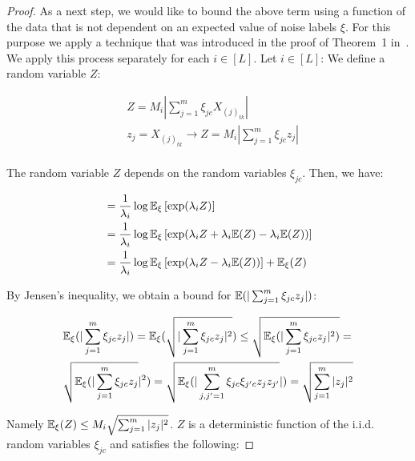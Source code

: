 \begin{proof}
As a next step, we would like to bound the above term using a function of the data that is not dependent on an expected value of noise labels $\xi$. For this purpose we apply a technique that was introduced in the proof of Theorem~1 in~\citep{golowich2018size}. We apply this process separately for each $i \in [L]$. Let $i \in [L]$:
We define a random variable $Z$:
\begin{small}
\begin{equation*}
\begin{aligned}
&Z = M_i  \left| \sum_{j=1}^m \xi_{jc} X^{}_{{(j)}_{tk}} \right| \\
&z_j = X^{}_{{(j)}_{tk}} \rightarrow Z = M_i |\sum_{j=1}^m \xi_{jc} z_j | \\
\end{aligned}
\end{equation*}
\end{small}
The random variable $Z$ depends on the random variables $\xi_{jc}$.
Then, we have: 
\begin{small}
\begin{equation*}
\begin{aligned}
&=\frac{1}{\lambda_i} \log \mathbb{E}_{\xi}\left[\exp( \lambda _iZ) \right] \\
&=\frac{1}{\lambda_i} \log \mathbb{E}_{\xi}\left[\exp( \lambda_i Z + \lambda_i\mathbb{E}(Z) - \lambda_i \mathbb{E}(Z)) \right] \\
&=\frac{1}{\lambda_i} \log \mathbb{E}_{\xi}\left[\exp( \lambda_i Z - \lambda_i \mathbb{E}(Z)) \right] +  \mathbb{E}_{\xi} (Z) \\
\end{aligned}
\end{equation*}
\end{small}
By Jensen’s inequality, we obtain a bound for $\mathbb{E}(|\sum_{j=1}^m \xi_{jc} z_j |)$:
\begin{small}
\begin{equation*}
\begin{aligned}
&\mathbb{E}_{\xi} (|\sum_{j=1}^m \xi_{jc} z_j |) = \mathbb{E}_{\xi} (\sqrt{|\sum_{j=1}^m \xi_{jc} z_j |^2}) \leq \sqrt{\mathbb{E}_{\xi} (|\sum_{j=1}^m \xi_{jc} z_j |^2)} = \\& \sqrt{\mathbb{E}_{\xi} (|\sum_{j=1}^m \xi_{jc} z_j} |^2) = \sqrt{\mathbb{E}_{\xi} (|\sum_{j,j'=1}^m \xi_{jc} \xi_{j'c} z_j z_{j'}} |) = \sqrt{\sum_{j=1}^m |z_j|^2} 
\end{aligned}
\end{equation*}
\end{small}
Namely $\mathbb{E}_{\xi}(Z) \leq M_i \sqrt{\sum_{j=1}^m |z_j|^2} $.
$Z$ is a deterministic function of the i.i.d. random variables  $\xi_{jc}$ and satisfies the following:

\end{proof}
